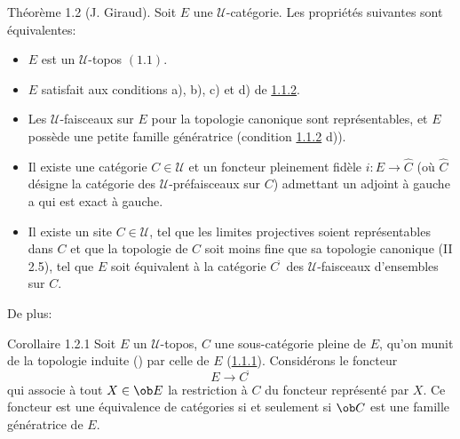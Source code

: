 \documentclass[10pt]{../fichiers-configuration-latex/smfart}
\begin{document}
\begin{enonce*}{Théorème 1.2}
{\rm (J. Giraud).} Soit $E$ une $𝒰$-catégorie. Les
propriétés suivantes sont équivalentes:
\begin{itemize}
\item[i)] $E$ est un $𝒰$-topos $(\hyperref[IV.def1.1]{1.1})$.

\item[ii)] $E$ satisfait aux conditions {\rm a), b), c)} et {\rm d)
  de \hyperref[IV.subsubsec1.1.2]{1.1.2}.}

\item[iii)] Les $𝒰$-faisceaux sur $E$ pour la topologie
  canonique sont représentables, et $E$ possède une petite famille
  génératrice (condition {\rm \hyperref[IV.subsubsec1.1.2]{1.1.2} d)}).

\item[iv)] Il existe une catégorie $C\in 𝒰$ et un foncteur
  pleinement fidèle $i:E\rightarrow \widehat{C}$ (où $\widehat{C}$
  désigne la catégorie des $𝒰$-préfaisceaux sur $C$)
  admettant un adjoint à gauche a qui est exact à gauche.

\item[${\rm i')}$] Il existe un site $C\in 𝒰$, tel que les
  limites projectives soient représentables dans $C$ et que la
  topologie de $C$ soit moins fine que sa topologie canonique {\rm (II 2.5),} %
  tel que $E$ soit équivalent à la catégorie
  $C^{\widetilde{\phantom{,}}}$ des $𝒰$-faisceaux d'ensembles
  sur $C$.
\end{itemize}
\end{enonce*}

De plus:

\begin{enonce*}{Corollaire 1.2.1}
Soit $E$ un $𝒰$-topos, $C$ une sous-catégorie pleine de
$E$, qu'on munit de la topologie induite {\rm ()}
par celle de $E$ (\hyperref[IV.subsubsec1.1.1]{1.1.1}). Considérons le
foncteur
$$
E\longrightarrow C^{\widetilde{\phantom{,}}}
$$
qui associe à tout $X\in \ob E$ la restriction à $C$ du foncteur
représenté par $X$. Ce foncteur est une équivalence de
catégories si et seulement si $\ob C$ est une famille
génératrice de $E$.
\end{enonce*}
\end{document}
